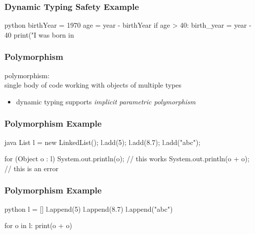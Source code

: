 \documentclass[dvipsnames]{beamer}
\theoremstyle{plain}
\begin{document}
\begin{frame}[fragile]
  \frametitle{Dynamic Typing Safety Example}

  \begin{example}[Python]
    \begin{pygments}{python}
birthYear = 1970
age = year - birthYear
if age > 40:
    birth_year = year - 40
print("I was born in %
    \end{pygments}
  \end{example}
\end{frame}

\begin{frame}
  \frametitle{Polymorphism}

  \begin{definition}
    \alert{polymorphism}:\\
      single body of code working with objects of multiple types
  \end{definition}

  \begin{itemize}
    \item dynamic typing supports \emph{implicit parametric polymorphism}
  \end{itemize}
\end{frame}

\begin{frame}[fragile]
  \frametitle{Polymorphism Example}

  \begin{example}[Java]
    \begin{pygments}{java}
List l = new LinkedList();
l.add(5);
l.add(8.7);
l.add("abc");

for (Object o : l) {
    System.out.println(o);        // this works
    System.out.println(o + o);    // this is an error
}
    \end{pygments}
  \end{example}
\end{frame}

\begin{frame}[fragile]
  \frametitle{Polymorphism Example}

  \begin{example}[Python]
    \begin{pygments}{python}
l = []
l.append(5)
l.append(8.7)
l.append("abc")

for o in l:
    print(o + o)
    \end{pygments}
  \end{example}
\end{frame}
\end{document}
